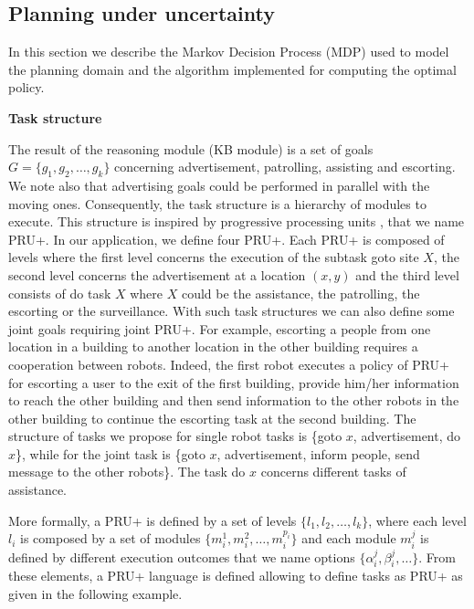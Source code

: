 \subsection{Planning under uncertainty}

In this section we describe the Markov Decision Process (MDP) used to model the \coaches planning domain and the algorithm implemented for computing the optimal policy.

\vspace{1em}
\noindent
{\bf Task structure}

The result of the reasoning module (KB module) is a set of goals $G = \{ g_{1}, g_{2}, \ldots, g_{k} \}$ concerning advertisement, patrolling, assisting and escorting.  We note also that advertising goals could be performed in parallel with the moving ones.  Consequently, the task structure is a hierarchy of modules to execute. This structure is  inspired by progressive processing units \cite{CarMouIjcai01}, that we  name PRU+. In our application, we define four PRU+. Each PRU+ is composed of levels where the first level concerns the execution of the subtask {\sc goto site $X$}, the second level concerns the advertisement at a location $(x,y)$ and the third level consists of {\sc do task $X$} where $X$ could be  the assistance, the patrolling, the escorting or the surveillance.%
With such task structures we can also define some joint goals requiring joint PRU+.  For example, escorting a people from one location in a building to another location in the other building requires a cooperation between robots. Indeed, the first robot executes a policy of PRU+ for escorting a user to the exit of the first building, provide him/her information to reach the other building and then send information to the other robots in the other building to continue the escorting task at the second building. The structure of tasks we propose for single robot tasks is  {\sc \{goto $x$, advertisement, do $x$\}}, while for the joint task is {\sc \{goto $x$, advertisement, inform people, send message to the other robots\}}. 
The task {\sc do $x$} concerns different tasks of assistance. 

More formally, a PRU+ is defined by a set of levels $\{ l_{1}, l_{2}, \ldots, l_{k} \}$, where each level $l_i$ is composed by a set of modules $\{m_{i}^{1}, m_{i}^{2}, \ldots, m_{i}^{p_{i}} \}$ and each module $m_i^j$ is defined by different execution outcomes that we name options $\{ \alpha_{i}^{j}, \beta_{i}^{j}, \ldots \}$.  From these elements, a PRU+ language is defined allowing to define tasks as PRU+ as given in the following example.  

